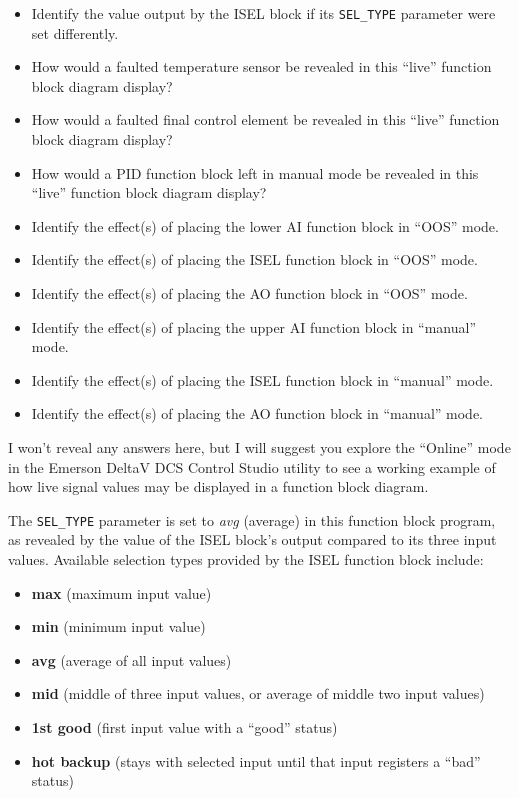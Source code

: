 \begin{itemize}
\item{} Identify the value output by the ISEL block if its {\tt SEL\_TYPE} parameter were set differently.
\item{} How would a faulted temperature sensor be revealed in this ``live'' function block diagram display?
\item{} How would a faulted final control element be revealed in this ``live'' function block diagram display?
\item{} How would a PID function block left in manual mode be revealed in this ``live'' function block diagram display?
\item{} Identify the effect(s) of placing the lower AI function block in ``OOS'' mode.
\item{} Identify the effect(s) of placing the ISEL function block in ``OOS'' mode.
\item{} Identify the effect(s) of placing the AO function block in ``OOS'' mode.
\item{} Identify the effect(s) of placing the upper AI function block in ``manual'' mode.
\item{} Identify the effect(s) of placing the ISEL function block in ``manual'' mode.
\item{} Identify the effect(s) of placing the AO function block in ``manual'' mode.
\end{itemize}







I won't reveal any answers here, but I will suggest you explore the ``Online'' mode in the Emerson DeltaV DCS Control Studio utility to see a working example of how live signal values may be displayed in a function block diagram.







The {\tt SEL\_TYPE} parameter is set to {\it avg} (average) in this function block program, as revealed by the value of the ISEL block's output compared to its three input values.  Available selection types provided by the ISEL function block include:

\begin{itemize}
\item{} {\bf max} (maximum input value)
\item{} {\bf min} (minimum input value)
\item{} {\bf avg} (average of all input values)
\item{} {\bf mid} (middle of three input values, or average of middle two input values)
\item{} {\bf 1st good} (first input value with a ``good'' status)
\item{} {\bf hot backup} (stays with selected input until that input registers a ``bad'' status)
\end{itemize}





